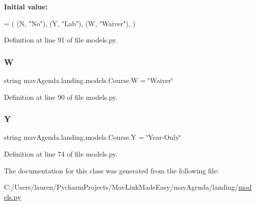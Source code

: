 {\bfseries Initial value\+:}
\begin{DoxyCode}
=  (
        (N, \textcolor{stringliteral}{"No"}),
        (Y, \textcolor{stringliteral}{"Lab"}),
        (W, \textcolor{stringliteral}{"Waiver"}),
    )
\end{DoxyCode}


Definition at line 91 of file models.\+py.

\mbox{\label{classmavAgenda_1_1landing_1_1models_1_1Course_a81fad615d231e798df111c953407c255}} 
\subsubsection{\texorpdfstring{W}{W}}
{\footnotesize\ttfamily string mav\+Agenda.\+landing.\+models.\+Course.\+W = \char`\"{}Waiver\char`\"{}\hspace{0.3cm}{\ttfamily [static]}}



Definition at line 90 of file models.\+py.

\mbox{\label{classmavAgenda_1_1landing_1_1models_1_1Course_a1bf10eebe4267736e6680c1ad015ee30}} 
\subsubsection{\texorpdfstring{Y}{Y}}
{\footnotesize\ttfamily string mav\+Agenda.\+landing.\+models.\+Course.\+Y = \char`\"{}Year-\/Only\char`\"{}\hspace{0.3cm}{\ttfamily [static]}}



Definition at line 74 of file models.\+py.



The documentation for this class was generated from the following file\+:\begin{DoxyCompactItemize}
\item 
C\+:/\+Users/lauren/\+Pycharm\+Projects/\+Mav\+Link\+Made\+Easy/mav\+Agenda/landing/\mbox{\hyperlink{models_8py}{models.\+py}}\end{DoxyCompactItemize}
